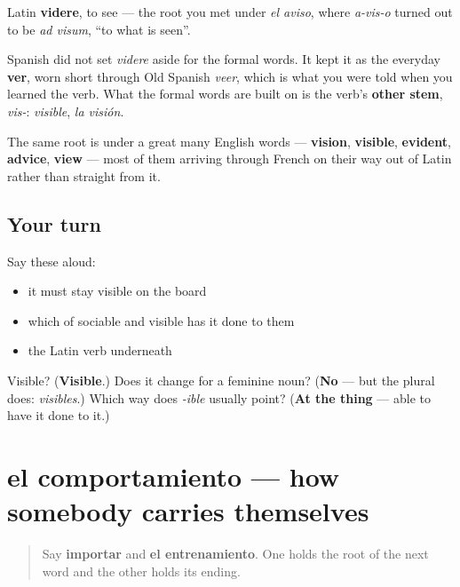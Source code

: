\begin{cousinweb}
Latin \textbf{videre}, to see — the root you met under \emph{el aviso}, where \emph{a-vis-o} turned out to be \emph{ad visum}, \textquotedblleft{}to what is seen\textquotedblright{}.

Spanish did not set \emph{videre} aside for the formal words. It kept it as the everyday \textbf{ver}, worn short through Old Spanish \emph{veer}, which is what you were told when you learned the verb. What the formal words are built on is the verb's \textbf{other stem}, \emph{vis-}: \emph{visible}, \emph{la visión}.

The same root is under a great many English words — \textbf{vision}, \textbf{visible}, \textbf{evident}, \textbf{advice}, \textbf{view} — most of them arriving through French on their way out of Latin rather than straight from it.
\end{cousinweb}

\subsection*{Your turn}
Say these aloud:

\begin{itemize}
\raggedright
  \item it must stay visible on the board
  \item which of sociable and visible has it done to them
  \item the Latin verb underneath
\end{itemize}

\begin{tcolorbox}[breakable,colback=teal!4,colframe=teal!35!black,title={Before you move on}]
Visible? (\textbf{Visible}.) Does it change for a feminine noun? (\textbf{No} — but the plural does: \emph{visibles}.) Which way does \emph{-ible} usually point? (\textbf{At the thing} — able to have it done to it.)
\end{tcolorbox}
\section[el comportamiento]{el comportamiento — how somebody carries themselves}

\label{lesson:ES-C466-comportamiento}



\begin{quote}
Say \textbf{importar} and \textbf{el entrenamiento}. One holds the root of the next word and the other holds its ending.
\end{quote}

